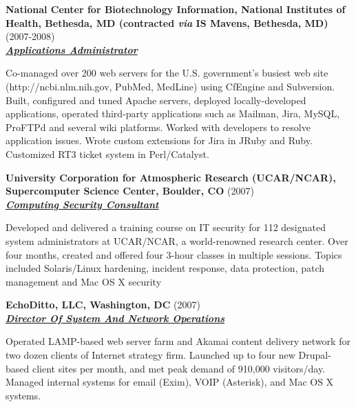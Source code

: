 \documentclass{article}
\newcommand{\employer}[3]{{ \textbf{#1} (#2)\\ \underline{\textbf{\emph{#3}}}\\ \nopagebreak }}
\newenvironment{achievements}{\begin{list}{\topsep 0pt \itemsep -2pt}} {\vspace*{4pt}\end{list}}
\begin{document}
\employer{National Center for Biotechnology Information, National Institutes
of Health, Bethesda, MD (contracted \emph{via} IS Mavens, Bethesda, MD)}{2007-2008}{Applications Administrator}
\begin{achievements}
   \item Co-managed over 200 web servers for the U.S. government's busiest web site (http://ncbi.nlm.nih.gov, PubMed, MedLine) using CfEngine and Subversion.  Built, configured and tuned Apache servers, deployed locally-developed applications, operated third-party applications such as Mailman, Jira, MySQL, ProFTPd and several wiki platforms.  Worked with developers to resolve application issues.  Wrote custom extensions for Jira in JRuby and Ruby.  Customized RT3 ticket system in Perl/Catalyst.
\end{achievements}

\employer{University Corporation for Atmospheric Research (UCAR/NCAR),
Supercomputer Science Center, Boulder, CO}{2007}{Computing Security Consultant}

\begin{achievements}
\item Developed and delivered a training course on IT security for 112 designated system administrators at UCAR/NCAR, a world-renowned research center.  Over four months, created and offered four 3-hour classes in multiple sessions. Topics included Solaris/Linux hardening, incident response, data protection, patch management and Mac OS X security
\end{achievements}

\employer{EchoDitto, LLC, Washington, DC}{2007}{Director Of System And Network Operations}
\begin{achievements}
  \item Operated LAMP-based web server farm and Akamai content delivery network for two dozen clients of Internet strategy firm.  Launched up to four new Drupal-based client sites per month, and met peak demand of 910,000 visitors/day.  Managed internal systems for email (Exim), VOIP (Asterisk), and Mac OS X systems. 
\end{achievements}
 
\end{document}

